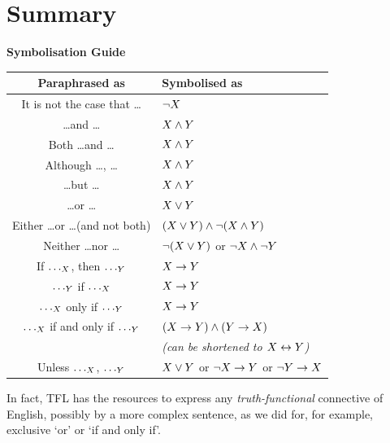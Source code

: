 \section{Summary}

\begin{highlighted}
	\textbf{Symbolisation Guide}
	
	\smallskip 
	
	\begin{tabular}{c|l}
		\textbf{Paraphrased as} & \textbf{Symbolised as}\\[.5em]\hline
		It is not the case that \ldots & $\neg X$\\[.4em]
		\ldots and \ldots & $X \mathbin{\wedge} Y$\\[.4em]
		Both \ldots and \ldots & $X \mathbin{\wedge} Y$\\[.4em]
		Although \ldots, \ldots & $X \mathbin{\wedge} Y$\\[.4em]
		\ldots but \ldots & $X \mathbin{\wedge} Y$\\[.4em]
		\ldots or \ldots & $X \vee Y$\\[.4em]
		Either \ldots or \ldots (and not both) & $(X \vee Y) \mathbin{\wedge} \neg(X \mathbin{\wedge} Y)$\\[.4em]
		Neither \ldots nor \ldots & $\neg(X \vee Y)$ or $\neg X \mathbin{\wedge} \neg Y$\\[.4em]
		If $\ldots_{X}$, then $\ldots_{Y}$ & $X \rightarrow Y$\\[.4em]
		$\ldots_{Y}$ if $\ldots_{X}$ & $X \rightarrow Y$\\[.4em]
		$\ldots_{X}$ only if $\ldots_{Y}$ & $X \rightarrow Y$\\[.4em]
		$\ldots_{X}$ if and only if $\ldots_{Y}$ & $(X \rightarrow Y)\mathbin{\wedge}(Y\rightarrow X)$ \\&\quad \emph{(can be shortened to $X\leftrightarrow Y$)}\\[.4em]
		Unless $\ldots_{X}$, $\ldots_{Y}$ & $X \vee Y$ or $\neg X\rightarrow Y$ or $\neg Y\rightarrow X$\\
	\end{tabular}
\end{highlighted}



In fact, TFL has the resources to express any \emph{truth-functional} connective of English, possibly by a more complex sentence, as we did for, for example, exclusive `or' or `if and only if'. 

